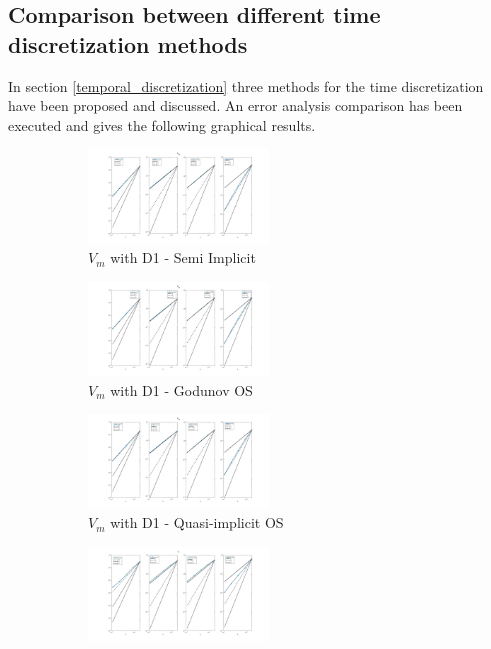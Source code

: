 \documentclass[a4paper,11pt]{article}
\begin{document}
\newpage
\vspace*{5mm}
\subsection{Comparison between different time discretization methods}
In section \ref{temporal_discretization} three methods for the time discretization have been proposed and discussed. An error analysis comparison has been executed and gives the following graphical results. \\
\begin{figure}[h]
\begin{subfigure}{0.3\textwidth}
\includegraphics[width = 4.8cm]{./D1_Vm_1.jpg}
\caption*{$V_m$ with D1 - Semi Implicit}
\label{Vm_D1_SI}
\end{subfigure}
\begin{subfigure}{0.3\textwidth}
\includegraphics[width =4.8cm]{./D1_Vm_1_GO.jpg}
\caption*{$V_m$ with D1 - Godunov OS}
\label{Vm_D1_GO}
\end{subfigure}
\begin{subfigure}{0.3\textwidth}
\includegraphics[width =4.8cm]{./D1_Vm_1_OS.jpg}
\caption*{$V_m$ with D1 - Quasi-implicit OS}
\label{Vm_D1_OS}
\end{subfigure}
\newline
\begin{subfigure}{0.3\textwidth}
\includegraphics[width = 4.8cm]{./D1_Phii_1.jpg}

\end{subfigure}
\end{figure}
\end{document}
